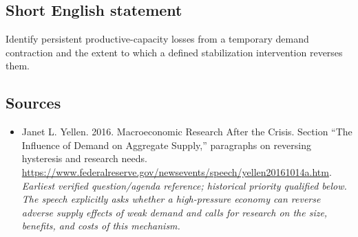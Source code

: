 \documentclass[11pt]{article}
\begin{document}
\subsection{Short English statement}
Identify persistent productive-capacity losses from a temporary demand contraction and the extent to which a defined stabilization intervention reverses them.

\subsection{Sources}
\begin{itemize}\raggedright
\item[\textnormal{[S1]}]\hypertarget{source:30007517:1}{} Janet L. Yellen. 2016. Macroeconomic Research After the Crisis. Section “The Influence of Demand on Aggregate Supply,” paragraphs on reversing hysteresis and research needs.
\url{https://www.federalreserve.gov/newsevents/speech/yellen20161014a.htm}.
{\small\textit{Earliest verified question/agenda reference; historical priority qualified below. The speech explicitly asks whether a high-pressure economy can reverse adverse supply effects of weak demand and calls for research on the size, benefits, and costs of this mechanism.}}
\end{itemize}
\end{document}

